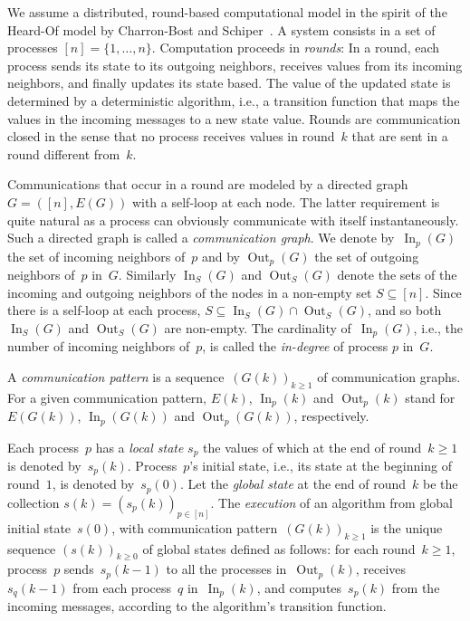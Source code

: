 \documentclass[a4paper]{article}
\theoremstyle{newthm}
\renewcommand{\ge}{\geqslant}
\DeclareMathOperator\In{In}
\DeclareMathOperator\Out{Out}
\begin{document}
We assume a distributed, round-based computational model in the spirit
     of the Heard-Of model by Charron-Bost and Schiper~\cite{CS09}.
A system consists in a set  of processes $[n] = \{1,\dots,n\}$.
Computation proceeds in {\em rounds}:
In a round, each process sends its state to its outgoing neighbors,
	 receives values from its incoming neighbors, and
     finally updates its state based.
The  value of the updated state is determined by a deterministic
     algorithm, i.e., a transition function that maps the values in the
     incoming messages  to a  new state value.
Rounds are communication closed in the sense that no process receives
     values in round~$k$ that are sent in a round different from~$k$.

Communications that occur in a round are modeled by a directed graph~$G=([n], E(G))$ 
	with  a self-loop at each node.
The latter requirement is quite natural as a process can obviously communicate with 
	itself instantaneously.
Such a directed graph is called a  {\em communication graph}.
We denote by~$\In_p(G)$ the set
     of incoming neighbors of~$p$ and by $\Out_p(G)$ the set of
     outgoing neighbors of~$p$ in~$G$.
Similarly $\In_S(G)$ and  $\Out_S(G)$ denote the sets of the incoming and
	outgoing neighbors of the nodes in a non-empty set $S \subseteq [n]$.
Since there is a self-loop at each process,   
	$	S \subseteq \In_S(G) \cap \Out_S(G) $,
	and so  both $\In_S(G)$  and $\Out_S(G)$ 
	are  non-empty.
The  cardinality of~$\In_p(G)$, i.e.,  the number of incoming neighbors of~$p$,
	is called the {\em in-degree} of process $p$ in~$G$.

A {\em communication pattern\/} is a sequence~$(G(k))_{k\ge 1}$ of
     communication graphs.
For a given communication pattern, $E(k)$,
	$\In_p(k)$ and  $\Out_p(k)$ stand for
	$E \left( G(k) \right)$, $\In_p(G(k))$ and $\Out_p(G(k))$, respectively.

     
Each process~$p$ has a {\em local state\/} $s_p$ the values of which at
     the end of round~$k \ge 1$ is denoted by~$s_p(k)$.
Process~$p$'s initial state, i.e., its state at the beginning of round~$1$,
     is denoted by~$s_p(0)$.
Let the {\em global state} at the end of round~$k$ be the collection
     $s(k) = (s_p(k))_{p \in [n]}$.
The {\em execution\/} of an algorithm from global initial state~$s(0)$,
     with communication pattern~$(G(k))_{k\ge 1}$ is the unique
      sequence $(s(k))_{k\ge 0}$ of global states defined as follows:  for  each round~$k \ge 1$, 
      process~$p$ sends~$s_p(k-1)$ to all the processes in~$\Out_p(k)$,
     receives $s_q(k-1)$ from each process~$q$ in~$\In_p(k)$, and
     computes~$s_p(k)$ from the incoming messages, according to the
     algorithm's transition function.
 
\end{document}
